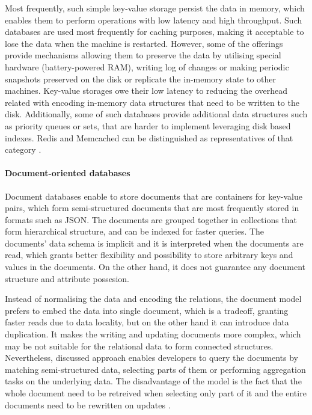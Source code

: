 Most frequently, such simple key-value storage persist the data in memory, which enables them to perform operations with low latency and high throughput. Such databases are used most frequently for caching purposes, making it acceptable to lose the data when the machine is restarted. However, some of the offerings provide mechanisms allowing them to preserve the data by utilising special hardware (battery-powered RAM), writing log of changes or making periodic snapshots preserved on the disk or replicate the in-memory state to other machines. Key-value storages owe their low latency to reducing the overhead related with encoding in-memory data structures that need to be written to the disk. Additionally, some of such databases provide additional data structures such as priority queues or sets, that are harder to implement leveraging disk based indexes. Redis \cite{Redis} and Memcached \cite{Memcached} can be distinguished as representatives of that category \cite{DesignDataIntensiveApplications}. 

\paragraph{Document-oriented databases}

Document databases enable to store documents that are containers for key-value pairs, which form semi-structured documents that are most frequently stored in formats such as JSON. The documents are grouped together in collections that form hierarchical structure, and can be indexed for faster queries. The documents' data schema is implicit and it is interpreted when the documents are read, which grants better flexibility and possibility to store arbitrary keys and values in the documents. On the other hand, it does not guarantee any document structure and attribute possesion.

Instead of normalising the data and encoding the relations, the document model prefers to embed the data into single document, which is a tradeoff, granting faster reads due to data locality, but on the other hand it can introduce data duplication. It makes the writing and updating documents more complex, which may be not suitable for the relational data to form connected structures. Nevertheless, discussed approach enables developers to query the documents by matching semi-structured data, selecting parts of them or performing aggregation tasks on the underlying data. 
The disadvantage of the model is the fact that the whole document need to be retreived when selecting only part of it and the entire documents need to be rewritten on updates \cite{DesignDataIntensiveApplications}.

